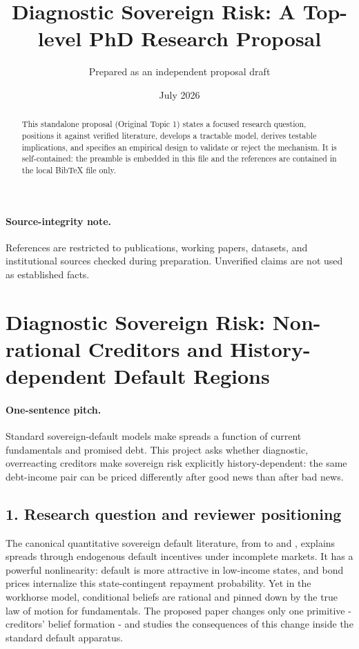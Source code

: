 \documentclass[11pt]{article}
\title{Diagnostic Sovereign Risk: A Top-level PhD Research Proposal}
\author{Prepared as an independent proposal draft}
\date{July 2026}
\begin{document}
\maketitle
\begin{abstract}
This standalone proposal (Original Topic 1) states a focused research question, positions it against verified literature, develops a tractable model, derives testable implications, and specifies an empirical design to validate or reject the mechanism. It is self-contained: the preamble is embedded in this file and the references are contained in the local BibTeX file only.
\end{abstract}

\paragraph{Source-integrity note.} References are restricted to publications, working papers, datasets, and institutional sources checked during preparation. Unverified claims are not used as established facts.

\section{Diagnostic Sovereign Risk: Non-rational Creditors and History-dependent Default Regions}

\paragraph{One-sentence pitch.} Standard sovereign-default models make spreads a function of current fundamentals and promised debt. This project asks whether diagnostic, overreacting creditors make sovereign risk explicitly history-dependent: the same debt-income pair can be priced differently after good news than after bad news.

\subsection*{1. Research question and reviewer positioning}
The canonical quantitative sovereign default literature, from \citet{EatonGersovitz1981} to \citet{Arellano2008} and \citet{ChatterjeeEyigungor2012}, explains spreads through endogenous default incentives under incomplete markets. It has a powerful nonlinearity: default is more attractive in low-income states, and bond prices internalize this state-contingent repayment probability. Yet in the workhorse model, conditional beliefs are rational and pinned down by the true law of motion for fundamentals. The proposed paper changes only one primitive - creditors' belief formation - and studies the consequences of this change inside the standard default apparatus.
\end{document}
